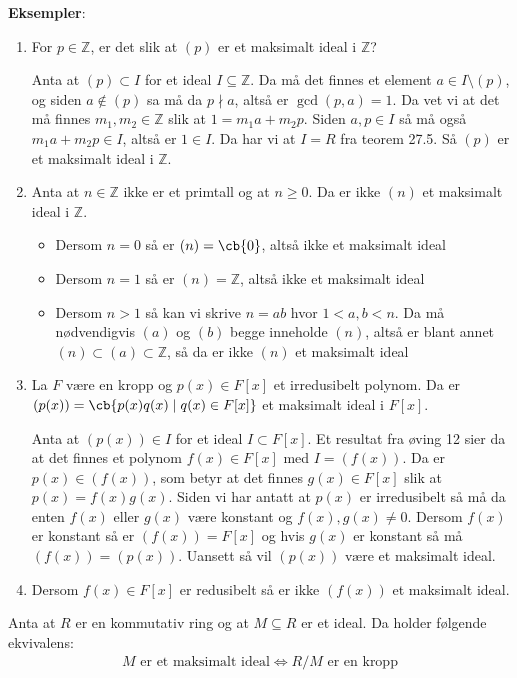 \textbf{Eksempler}:
\begin{enumerate}
	\item For $p\in \mathbb{Z}$, er det slik at $(p)$ er et maksimalt ideal i $\mathbb{Z}$?

	      Anta at $(p)\subset I$ for et ideal $I\subseteq \mathbb{Z}$. Da må det finnes et element
	      $a\in I\setminus (p)$, og siden $a\not\in (p)$ sa må da $p\nmid a$, altså er $\gcd(p,a)=1$.
	      Da vet vi at det må finnes $m_1, m_2\in \mathbb{Z}$ slik at $1=m_1a+m_2p$. Siden $a,p\in I$
	      så må også $m_1a+m_2p\in I$, altså er $1\in I$. Da har vi at $I=R$ fra teorem 27.5. Så
	      $(p)$ er et maksimalt ideal i $\mathbb{Z}$.

	\item Anta at $n\in \mathbb{Z}$ ikke er et primtall og at $n\geq 0$. Da er ikke $(n)$ et maksimalt
	      ideal i $\mathbb{Z}$.

	      \begin{itemize}
		      \item Dersom $n=0$ så er $(n)=\cb{0}$, altså ikke et maksimalt ideal
		      \item Dersom $n=1$ så er $(n)= \mathbb{Z}$, altså ikke et maksimalt ideal
		      \item Dersom $n>1$ så kan vi skrive $n=ab$ hvor $1<a,b<n$. Da må nødvendigvis $(a)$ og
		            $(b)$ begge inneholde $(n)$, altså er blant annet $(n)\subset (a)\subset \mathbb{Z}$,
		            så da er ikke $(n)$ et maksimalt ideal
	      \end{itemize}
	\item La $F$ være en kropp og $p(x)\in F[x]$ et irredusibelt polynom. Da er
	      $(p(x))=\cb{p(x)q(x)\mid q(x)\in F[x]}$ et maksimalt ideal i $F[x]$.

	      Anta at $(p(x))\in I$ for et ideal $I\subset F[x]$. Et resultat fra øving 12 sier da at det
	      finnes et polynom $f(x)\in F[x]$ med $I=(f(x))$. Da er $p(x)\in(f(x))$, som betyr at det finnes
	      $g(x)\in F[x]$ slik at $p(x)=f(x)g(x)$. Siden vi har antatt at $p(x)$ er irredusibelt
	      så må da enten $f(x)$ eller $g(x)$ være konstant og $f(x), g(x)\neq 0$. Dersom $f(x)$ er
	      konstant så er $(f(x))=F[x]$ og hvis $g(x)$ er konstant så må $(f(x))=(p(x))$. Uansett
	      så vil $(p(x))$ være et maksimalt ideal.
	\item Dersom $f(x)\in F[x]$ er redusibelt så er ikke $(f(x))$ et maksimalt ideal.
\end{enumerate}

\begin{theorem*}{27.9}{}
	Anta at $R$ er en kommutativ ring og at $M\subseteq R$ er et ideal. Da holder følgende
	ekvivalens:
	\begin{align}
		M \text{ er et maksimalt ideal}\iff R/M \text{ er en kropp}
	\end{align}
\end{theorem*}

